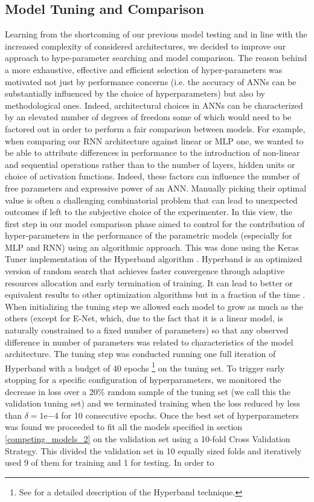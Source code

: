 \subsection{Model Tuning and Comparison}
\label{tuning_comparison_2}
Learning from the shortcoming of our previous model testing and in line with the increased complexity of considered architectures, we decided to improve our approach to hype-parameter searching and model comparison. The reason behind a more exhaustive, effective and efficient selection of hyper-parameters was motivated not just by performance concerns (i.e. the accuracy of ANNs can be substantially influenced by the choice of hyperparameters) but also by methodological ones. Indeed, architectural choices in ANNs can be characterized by an elevated number of degrees of freedom some of which would need to be factored out in order to perform a fair comparison between models. For example, when comparing our RNN architecture against linear or MLP one, we wanted to be able to attribute differences in performance to the introduction of non-linear and sequential operations rather than to the number of layers, hidden units or choice of activation functions. Indeed, these factors can influence the number of free parameters and expressive power of an ANN. Manually picking their optimal value is often a challenging combinatorial problem that can lead to unexpected outcomes if left to the subjective choice of the experimenter. In this view, the first step in our model comparison phase aimed to control for the contribution of hyper-parameters in the performance of the parametric models (especially for MLP and RNN) using an algorithmic approach. This was done using the Keras Tuner implementation \cite{omalley2019kerastuner} of the Hyperband algorithm \cite{li2017hyperband}. Hyperband is an optimized version of random search that achieves faster convergence through adaptive resources allocation and early termination of training. It can lead to better or equivalent results to other optimization algorithms but in a fraction of the time \cite{li2017hyperband}. When initializing the tuning step we allowed each model to grow as much as the others (except for E-Net, which,  due to the fact that it is a linear model, is naturally constrained to a fixed number of parameters) so that any observed difference in number of parameters was related to characteristics of the model architecture. The tuning step was conducted running one full iteration of Hyperband with a budget of 40 epochs \footnote{See  \cite{li2017hyperband,hyperwebs} for a detailed description of the Hyperband technique.} on the tuning set. To trigger early stopping for a specific configuration of hyperparameters, we monitored the decrease in loss over a 20\% random sample of the tuning set (we call this the validation tuning set) and we terminated training when the loss reduced by less than $\delta = 1\mathrm{e}{-4}$ for 10 consecutive epochs. Once the best set of hyperparameters was found we proceeded to fit all the models specified in section \ref{competing_models_2} on the validation set using a 10-fold Cross Validation Strategy. This  divided the validation set in 10 equally sized folds and iteratively used 9 of them for training and 1 for testing. In order to 